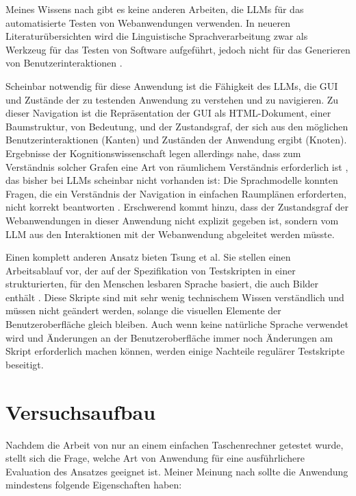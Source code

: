Meines Wissens nach gibt es keine anderen Arbeiten, die LLMs für das automatisierte Testen von Webanwendungen verwenden.
In neueren Literaturübersichten wird die Linguistische Sprachverarbeitung zwar als Werkzeug für das Testen von Software aufgeführt, jedoch nicht für das Generieren von Benutzerinteraktionen \cite{implementation_verma_2023, machine_fontes_2021}.

Scheinbar notwendig für diese Anwendung ist die Fähigkeit des LLMs, die GUI und Zustände der zu testenden Anwendung zu verstehen und zu navigieren.
Zu dieser Navigation ist die Repräsentation der GUI als HTML-Dokument, einer Baumstruktur, von Bedeutung, und der Zustandsgraf, der sich aus den möglichen Benutzerinteraktionen (Kanten) und Zuständen der Anwendung ergibt (Knoten).
Ergebnisse der Kognitionswissenschaft legen allerdings nahe, dass zum Verständnis solcher Grafen eine Art von räumlichem Verständnis erforderlich ist \cite{what_is_a_cognitive_map}, das bisher bei LLMs scheinbar nicht vorhanden ist:
Die Sprachmodelle konnten Fragen, die ein Verständnis der Navigation in einfachen Raumplänen erforderten, nicht korrekt beantworten \cite{cogmaps_llm}.
Erschwerend kommt hinzu, dass der Zustandsgraf der Webanwendungen in dieser Anwendung nicht explizit gegeben ist, sondern vom LLM aus den Interaktionen mit der Webanwendung abgeleitet werden müsste.

Einen komplett anderen Ansatz bieten Tsung et al.
Sie stellen einen Arbeitsablauf vor, der auf der Spezifikation von Testskripten in einer strukturierten, für den Menschen lesbaren Sprache basiert, die auch Bilder enthält \cite{tsung}.
Diese Skripte sind mit sehr wenig technischem Wissen verständlich und müssen nicht geändert werden, solange die visuellen Elemente der Benutzeroberfläche gleich bleiben.
Auch wenn keine natürliche Sprache verwendet wird und Änderungen an der Benutzeroberfläche immer noch Änderungen am Skript erforderlich machen können, werden einige Nachteile regulärer Testskripte beseitigt.


\chapter{Versuchsaufbau}
\label{ch:ExperimentalSetup}

Nachdem die Arbeit von  nur an einem einfachen Taschenrechner getestet wurde, stellt sich die Frage, welche Art von Anwendung für eine ausführlichere Evaluation des Ansatzes geeignet ist.
Meiner Meinung nach sollte die Anwendung mindestens folgende Eigenschaften haben:

